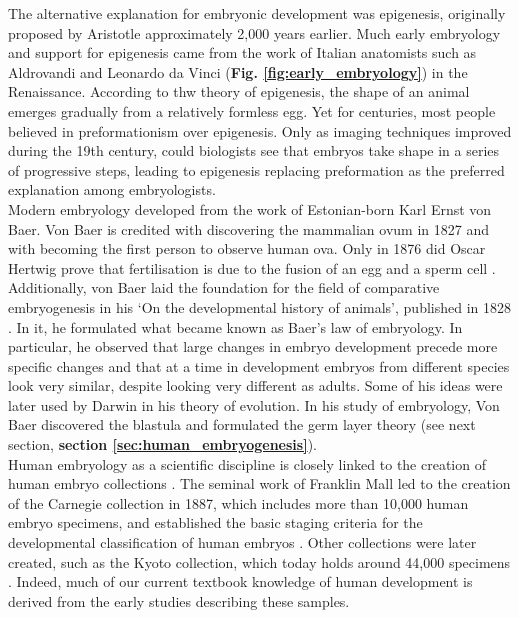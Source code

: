 The alternative explanation for embryonic development was epigenesis, originally proposed by Aristotle approximately 2,000 years earlier. 
Much early embryology and support for epigenesis came from the work of Italian anatomists such as Aldrovandi and Leonardo da Vinci (\textbf{Fig. \ref{fig:early_embryology}}) in the Renaissance.
According to thw theory of epigenesis, the shape of an animal emerges gradually from a relatively formless egg. 
Yet for centuries, most people believed in preformationism over epigenesis.
Only as imaging techniques improved during the 19th century, could biologists see that embryos take shape in a series of progressive steps, leading to epigenesis replacing preformation as the preferred explanation among embryologists.\\

Modern embryology developed from the work of Estonian-born Karl Ernst von Baer.
Von Baer is credited with discovering the mammalian ovum in 1827 and with becoming the first person to observe human ova.
Only in 1876 did Oscar Hertwig prove that fertilisation is due to the fusion of an egg and a sperm cell \cite{hertwig1875beitraege}.
Additionally, von Baer laid the foundation for the field of comparative embryogenesis in his `On the developmental history of animals', published in 1828 \cite{von1828entwickelungsgeschichte}.
In it, he formulated what became known as Baer's law of embryology.
In particular, he observed that large changes in embryo development precede more specific changes and that at a time in development embryos from different species look very similar, despite looking very different as adults.
Some of his ideas were later used by Darwin in his theory of evolution.
In his study of embryology, Von Baer discovered the blastula and formulated the germ layer theory (see next section, \textbf{section \ref{sec:human_embryogenesis}}).\\

\label{sec:carnegie_collection}
Human embryology as a scientific discipline is closely linked to the creation of human embryo collections \cite{yamada2015human, gasser2014rebirth, shahbazi2020mechanisms}. 
The seminal work of Franklin Mall led to the creation of the Carnegie collection in 1887, which includes more than 10,000 human embryo specimens, and established the basic staging criteria for the developmental classification of human embryos \cite{keibel1910manual}. 
Other collections were later created, such as the Kyoto collection, which today holds around 44,000 specimens \cite{nishimura1968normal}. 
Indeed, much of our current textbook knowledge of human development is derived from the early studies describing these samples.\\

